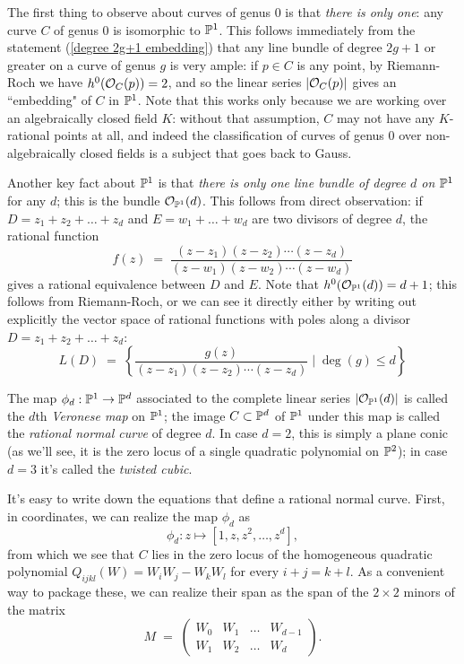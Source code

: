 The first thing to observe about curves of genus 0 is that \emph{there is only one}: any curve $C$ of genus 0 is isomorphic to ${\mathbb P}^1$. This follows immediately from the statement (\ref{degree 2g+1 embedding}) that any line bundle of degree $2g+1$ or greater on a curve of genus $g$ is very ample: if $p \in C$ is any point, by Riemann-Roch we have $h^0({\mathcal O}_C(p)) = 2$, and so the linear series $|{\mathcal O}_C(p)|$ gives an ``embedding" of $C$ in ${\mathbb P}^1$. Note that this works only because we are working over an algebraically closed field $K$: without that assumption, $C$ may not have any $K$-rational points at all, and indeed the classification of curves of genus 0 over non-algebraically closed fields is a subject that goes back to Gauss.

Another key fact about ${\mathbb P}^1$ is that \emph{there is only one line bundle of degree $d$ on ${\mathbb P}^1$} for any $d$; this is the bundle ${\mathcal O}_{{\mathbb P}^1}(d)$. This follows from direct observation: if $D = z_1+z_2+\dots+z_d$ and $E = w_1+\dots+w_d$ are two divisors of degree $d$, the rational function
$$
f(z) \; = \; \frac{(z-z_1)(z-z_2)\cdots(z-z_d)}{(z-w_1)(z-w_2)\cdots(z-w_d)}
$$
gives a rational equivalence between $D$ and $E$. Note that $h^0({\mathcal O}_{{\mathbb P}^1}(d)) = d+1$; this follows from Riemann-Roch, or we can see it directly either by writing out explicitly the vector space of rational functions with poles along a divisor $D = z_1+z_2+\dots+z_d$:
$$
L(D) \; = \; \left\{ \frac{g(z)}{(z-z_1)(z-z_2)\cdots(z-z_d)} \mid \deg(g) \leq d \right\}
$$

The map $\phi_d : {\mathbb P}^1 \to {\mathbb P}^d$ associated to the complete linear series $|{\mathcal O}_{{\mathbb P}^1}(d)|$ is called the $d$th \emph{Veronese map} on ${\mathbb P}^1$; the 
image $C \subset {\mathbb P}^d$ of ${\mathbb P}^1$ under this map  is called the \emph{rational normal curve} of degree $d$. In case $d=2$, this is simply a plane conic (as we'll see, it is the zero locus of a single quadratic polynomial on ${\mathbb P}^2$); in case $d=3$ it's called the \emph{twisted cubic}.

It's easy to write down the equations that define a rational normal curve. First, in coordinates, we can realize the map $\phi_d$ as
$$
\phi_d : z \mapsto [1, z, z^2,\dots,z^d],
$$
from which we see that $C$ lies in the zero locus of the homogeneous quadratic polynomial $Q_{ijkl}(W) = W_iW_j - W_kW_l$ for every $i+j=k+l$. As a convenient way to package these, we can realize their span as the span of the $2\times 2$ minors of the matrix
$$
M \; = \; \begin{pmatrix}
W_0 & W_1 & \dots & W_{d-1} \\
W_1 & W_2 & \dots & W_d
\end{pmatrix}.
$$

